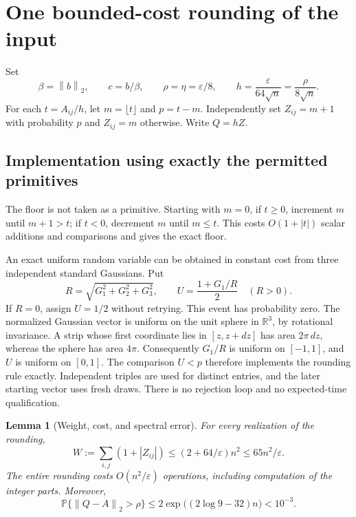 \documentclass[11pt,a4paper]{article}
\newtheorem{lemma}[theorem]{Lemma}
\theoremstyle{remark}
\newcommand{\R}{\mathbb R}
\newcommand{\PP}{\mathbb P}
\newcommand{\eps}{\varepsilon}
\newcommand{\norm}[1]{\left\|#1\right\|_2}
\begin{document}
\section{One bounded-cost rounding of the input}

Set
\begin{equation}\label{eq:parameters}
 \beta=\norm{b},\qquad c=b/\beta,\qquad
 \rho=\eta=\eps/8,\qquad h=\frac{\eps}{64\sqrt n}
      =\frac{\rho}{8\sqrt n}.
\end{equation}
For each $t=A_{ij}/h$, let $m=\lfloor t\rfloor$ and $p=t-m$.
Independently set $Z_{ij}=m+1$ with probability $p$ and $Z_{ij}=m$ otherwise.
Write $Q=hZ$.

\subsection{Implementation using exactly the permitted primitives}

The floor is not taken as a primitive. Starting with $m=0$, if $t\ge0$,
increment $m$ until $m+1>t$; if $t<0$, decrement $m$ until $m\le t$.
This costs $O(1+|t|)$ scalar additions and comparisons and gives the exact floor.

An exact uniform random variable can be obtained in constant cost from three
independent standard Gaussians. Put
\begin{equation}\label{eq:uniform}
 R=\sqrt{G_1^2+G_2^2+G_3^2},\qquad
 U=\frac{1+G_1/R}{2}\quad(R>0).
\end{equation}
If $R=0$, assign $U=1/2$ without retrying. This event has probability zero.
The normalized Gaussian vector is uniform on the unit sphere in $\R^3$,
by rotational invariance. A strip whose first coordinate lies in
$[z,z+dz]$ has area $2\pi\,dz$, whereas the sphere has area $4\pi$.
Consequently $G_1/R$ is uniform on $[-1,1]$, and $U$ is uniform on $[0,1]$.
The comparison $U<p$ therefore implements the rounding rule exactly. Independent
triples are used for distinct entries, and the later starting vector uses fresh
draws. There is no rejection loop and no expected-time qualification.

\begin{lemma}[Weight, cost, and spectral error]\label{lem:round}
For every realization of the rounding,
\begin{equation}\label{eq:weight}
 W:=\sum_{i,j}(1+|Z_{ij}|)
 \le (2+64/\eps)n^2\le65n^2/\eps.
\end{equation}
The entire rounding costs $O(n^2/\eps)$ operations, including computation of the
integer parts. Moreover,
\begin{equation}\label{eq:roundprob}
 \PP\{\norm{Q-A}>\rho\}
 \le 2\exp\bigl((2\log 9-32)n\bigr)<10^{-3}.
\end{equation}
\end{lemma}
\end{document}
